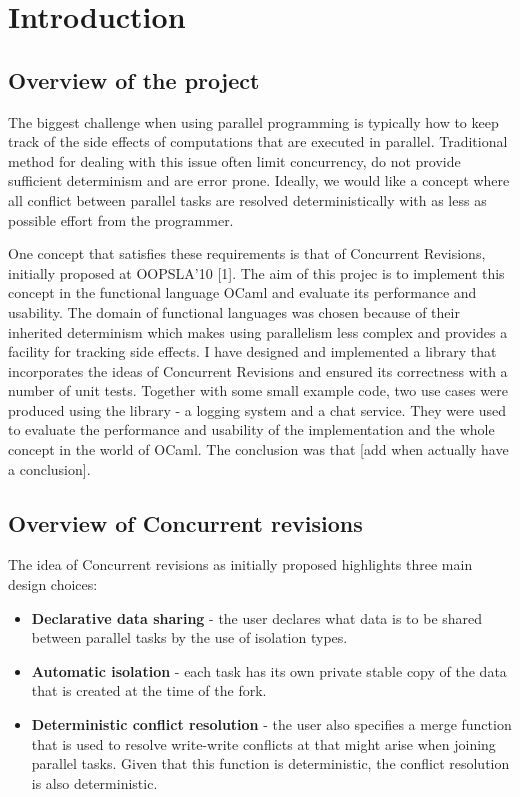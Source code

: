 \documentclass[12pt,twoside,notitlepage]{report}
\begin{document}
\chapter{Introduction}

\section{Overview of the project}
The biggest challenge when using parallel programming is typically how to keep track of the side effects of computations that are executed in parallel. Traditional method for dealing with this issue often limit concurrency, do not provide sufficient determinism and are error prone. Ideally, we would like a concept where all conflict between parallel tasks are resolved deterministically with as less as possible effort from the programmer. 

One concept that satisfies these requirements is that of Concurrent Revisions, initially proposed at OOPSLA'10 [1]. The aim of this projec is to implement this concept in the functional language OCaml and evaluate its performance and usability. The domain of functional languages was chosen because of their inherited determinism which makes using parallelism less complex and provides a facility for tracking side effects. I have designed and implemented a library that incorporates the ideas of Concurrent Revisions and ensured its correctness with a number of unit tests. Together with some small example code, two use cases were produced using the library - a logging system and a chat service. They were used to evaluate the performance and usability of the implementation and the whole concept in the world of OCaml. The conclusion was that [add when actually have a conclusion].  

\section{Overview of Concurrent revisions}

The idea of Concurrent revisions as initially proposed highlights three main design choices:
\begin{itemize}
\item {\bfseries Declarative data sharing} - the user declares what data is to be shared between parallel tasks by the use of isolation types.

\item {\bfseries Automatic isolation} - each task has its own private stable copy of the data that is created at the time of the fork.

\item {\bfseries Deterministic conflict resolution} - the user also specifies a merge function that is used to resolve write-write conflicts at that might arise when joining parallel tasks. Given that this function is deterministic, the conflict resolution is also deterministic.

\end{itemize}
\end{document}
